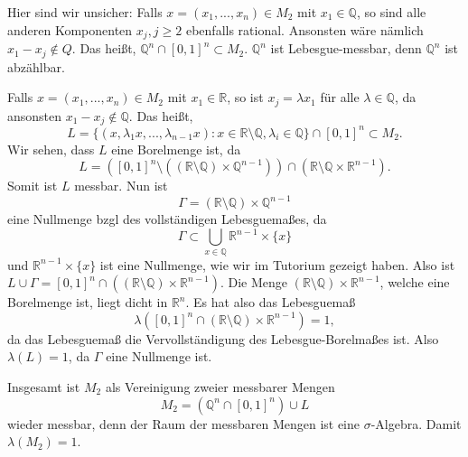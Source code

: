 \documentclass[a4paper]{article}
\begin{document}
Hier sind wir unsicher: Falls $x=(x_1,...,x_n) \in M_2$ mit $x_1 \in \mathbb Q$, so sind alle anderen Komponenten $x_j, j \geq 2$ ebenfalls rational. Ansonsten wäre nämlich $x_1 - x_j \notin Q$. Das heißt, $\mathbb Q^n \cap [0,1]^n \subset M_2$. $\mathbb Q^n$ ist Lebesgue-messbar, denn $\mathbb Q^n$ ist abzählbar. 

 Falls $x=(x_1,...,x_n) \in M_2$ mit $x_1 \in \mathbb R$, so ist $x_j = \lambda x_1$ für alle $\lambda \in \mathbb Q$, da ansonsten $x_1 - x_j \notin \mathbb Q$. Das heißt, $$L = \{ ( x, \lambda_1 x,..., \lambda_{n-1}x )  : x \in \mathbb R \setminus \mathbb Q, \lambda_i \in \mathbb Q \} \cap [0,1]^n \subset M_2.$$
Wir sehen, dass $L$ eine Borelmenge ist, da $$L = ([0,1]^n \setminus ((\mathbb R \setminus \mathbb Q) \times \mathbb Q^{n-1})) \cap (\mathbb R \setminus \mathbb Q \times \mathbb R^{n-1}).$$ Somit ist $L$ messbar. Nun ist $$\Gamma = (\mathbb R \setminus \mathbb Q) \times \mathbb Q^{n-1}$$ eine Nullmenge bzgl des vollständigen Lebesguemaßes, da $$\Gamma \subset \bigcup_{x \in \mathbb Q} \mathbb R^{n-1}\times \{ x\}$$ und $\mathbb R^{n-1}\times \{ x\}$ ist eine Nullmenge, wie wir im Tutorium gezeigt haben. Also ist $L \cup \Gamma = [0,1]^n \cap ((\mathbb R \setminus \mathbb Q) \times \mathbb R^{n-1})$. Die Menge $(\mathbb R \setminus \mathbb Q) \times \mathbb R^{n-1}$, welche eine Borelmenge ist, liegt dicht in $\mathbb R^n$. Es hat also das Lebesguemaß $$\lambda([0,1]^n \cap (\mathbb R \setminus \mathbb Q) \times \mathbb R^{n-1}) = 1,$$ da das Lebesguemaß die Vervollständigung des Lebesgue-Borelmaßes ist. Also $\lambda(L) = 1$, da $\Gamma$ eine Nullmenge ist.
 
 Insgesamt ist $M_2$ als Vereinigung zweier messbarer Mengen $$M_2 = (\mathbb Q^n \cap [0,1]^n )\cup L$$ wieder messbar, denn der Raum der messbaren Mengen ist eine $\sigma$-Algebra. Damit $\lambda(M_2) = 1$.
\end{document}
